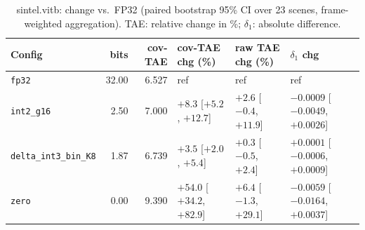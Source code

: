 \begin{table}[t]
\centering
\small
\caption{sintel.vitb: change vs.\ FP32 (paired bootstrap 95\% CI over 23 scenes, frame-weighted aggregation). TAE: relative change in \%; $\delta_1$: absolute difference.}
\label{tab:boot_sintel_vitb_fw}
\begin{tabular}{lrrlll}
\toprule
Config & bits & cov-TAE & cov-TAE chg (\%) & raw TAE chg (\%) & $\delta_1$ chg \\
\midrule
\texttt{fp32} & 32.00 & 6.527 & ref & ref & ref \\
\texttt{int2\_g16} & 2.50 & 7.000 & $+8.3$ [$+5.2$, $+12.7$] & $+2.6$ [$-0.4$, $+11.9$] & $-0.0009$ [$-0.0049$, $+0.0026$] \\
\texttt{delta\_int3\_bin\_K8} & 1.87 & 6.739 & $+3.5$ [$+2.0$, $+5.4$] & $+0.3$ [$-0.5$, $+2.4$] & $+0.0001$ [$-0.0006$, $+0.0009$] \\
\texttt{zero} & 0.00 & 9.390 & $+54.0$ [$+34.2$, $+82.9$] & $+6.4$ [$-1.3$, $+29.1$] & $-0.0059$ [$-0.0164$, $+0.0037$] \\
\bottomrule
\end{tabular}
\end{table}
